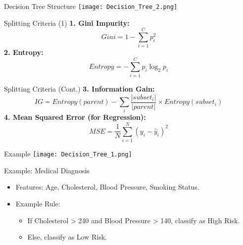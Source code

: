 \documentclass[serif, aspectratio=169]{beamer}
\begin{document}
\begin{frame}{Decision Tree Structure}
    \centering
    \texttt{[image: Decision\_Tree\_2.png]}
\end{frame}

\begin{frame}{Splitting Criteria (1)}
    \textbf{1. Gini Impurity:}
    \begin{equation}
        Gini = 1 - \sum_{i=1}^{C} p_i^2
    \end{equation}
    \textbf{2. Entropy:}
    \begin{equation}
        Entropy = - \sum_{i=1}^{C} p_i \log_2 p_i
    \end{equation}
\end{frame}

\begin{frame}{Splitting Criteria (Cont.)}
    \textbf{3. Information Gain:}
    \begin{equation}
        IG = Entropy(parent) - \sum_{i} \frac{|subset_i|}{|parent|} \times Entropy(subset_i)
    \end{equation}
    \textbf{4. Mean Squared Error (for Regression):}
    \begin{equation}
        MSE = \frac{1}{N} \sum_{i=1}^{N} (y_i - \hat{y}_i)^2
    \end{equation}
\end{frame}


\begin{frame}{Example}
    \centering
    \texttt{[image: Decision\_Tree\_1.png]}
\end{frame}

\begin{frame}{Example: Medical Diagnosis}
    \begin{itemize}
        \item Features: Age, Cholesterol, Blood Pressure, Smoking Status.
        \item Example Rule: 
        \begin{itemize}
            \item If Cholesterol > 240 and Blood Pressure > 140, classify as High Risk.
            \item Else, classify as Low Risk.
        \end{itemize}
    \end{itemize}
\end{frame}
\end{document}
